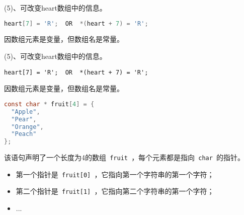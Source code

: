 \begin{frame}[fragile]
(5)、可改变heart数组中的信息。
\begin{lstlisting}[language=c,showstringspaces=true]
heart[7] = 'R';  OR  *(heart + 7) = 'R';
\end{lstlisting}
\vspace{0.05in}

因数组元素是变量，但数组名是常量。
\end{frame}

\begin{frame}[fragile]
(5)、可改变heart数组中的信息。
\begin{lstlisting}[basicstyle=\ttfamily,showstringspaces=true]
heart[7] = 'R';  OR  *(heart + 7) = 'R';
\end{lstlisting}
\vspace{0.05in}

因数组元素是变量，但数组名是常量。
\end{frame}

\begin{frame}[fragile]
\begin{lstlisting}[language=c,showstringspaces=true]
const char * fruit[4] = {
  "Apple",
  "Pear",
  "Orange",
  "Peach"
};
\end{lstlisting}
\vspace{0.05in}

该语句声明了一个长度为4的数组\lstinline| fruit |，每个元素都是指向\lstinline| char |的指针。
\vspace{0.05in}

\begin{itemize}
\item 第一个指针是\lstinline| fruit[0] |，它指向第一个字符串的第一个字符；
\item 第二个指针是\lstinline| fruit[1] |，它指向第二个字符串的第一个字符；
\item ...
\end{itemize}
\end{frame}
